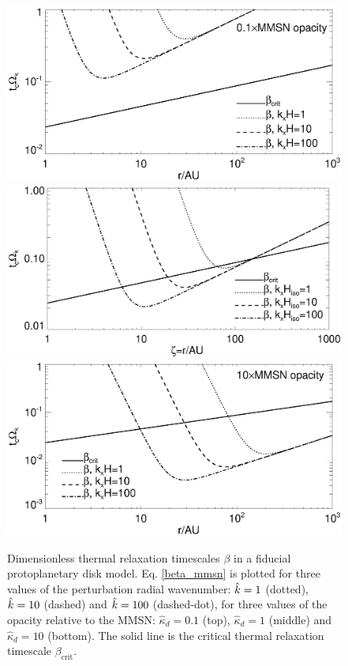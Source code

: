 \begin{figure}
  \includegraphics[scale=.43,clip=true,trim=0cm 1.8cm 0cm 0cm]{figures/bcrit_mmsn0d1} 
  \includegraphics[scale=.43,clip=true,trim=0cm 1.8cm 0cm 1cm]{figures/bcrit_mmsn}  
  \includegraphics[scale=.43,clip=true,trim=0cm 0cm 0cm 1cm]{figures/bcrit_mmsn10} 
  \caption{Dimensionless thermal relaxation timescales $\beta$ in a
    fiducial protoplanetary disk model. Eq. \ref{beta_mmsn} is plotted
    for three values of the 
    perturbation radial wavenumber: $\hat{k}=1$ (dotted), $\hat{k}=10$
    (dashed) and $\hat{k}=100$ (dashed-dot), for three values of the
    opacity relative to the MMSN: $\hat{\kappa}_d=0.1$ (top),
    $\hat{\kappa}_d=1$ (middle) and $\hat{\kappa}_d=10$ (bottom).  
    The solid line is the
    critical thermal relaxation timescale $\beta_\mathrm{crit}$. 
    \label{mmsn_bcrit_bcool}}   
\end{figure}  


